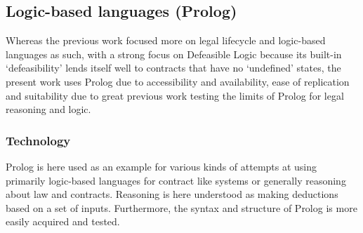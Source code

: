 \documentclass{article}
\begin{document}
\subsection{Logic-based languages (Prolog)}
Whereas the previous work \cite{governatoriLegalContractsImperative2018} focused more on legal lifecycle and logic-based languages as such, with a strong focus on Defeasible Logic because its built-in ‘defeasibility’ lends itself well to contracts that have no ‘undefined’ states, the present work uses Prolog due to accessibility and availability, ease of replication and suitability due to great previous work testing the limits of Prolog for legal reasoning and logic.

\subsubsection{Technology}
Prolog is here used as an example for various kinds of attempts at using primarily logic-based languages for contract like systems or generally reasoning about law and contracts. Reasoning is here understood as making deductions based on a set of inputs. Furthermore, the syntax and structure of Prolog is more easily acquired and tested. %
\end{document}
